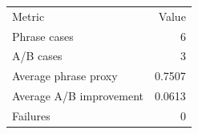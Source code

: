 \begin{tabular}{lr}
Metric & Value \\
Phrase cases & 6 \\
A/B cases & 3 \\
Average phrase proxy & 0.7507 \\
Average A/B improvement & 0.0613 \\
Failures & 0 \\
\end{tabular}

